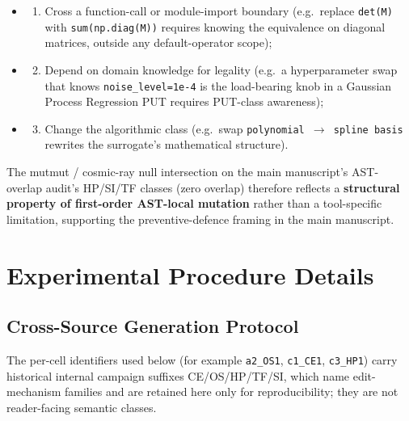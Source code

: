 \documentclass[manuscript,screen,review]{acmart}
\begin{document}
\begin{itemize}

\item
  \begin{enumerate}
  
  \item
    Cross a function-call or module-import boundary (e.g.~replace
    \texttt{det(M)} with \texttt{sum(np.diag(M))} requires knowing the
    equivalence on diagonal matrices, outside any default-operator
    scope);
  \end{enumerate}
\item
  \begin{enumerate}
  \setcounter{enumi}{1}
  
  \item
    Depend on domain knowledge for legality (e.g.~a hyperparameter swap
    that knows \texttt{noise\_level=1e-4} is the load-bearing knob in a
    Gaussian Process Regression PUT requires PUT-class awareness);
  \end{enumerate}
\item
  \begin{enumerate}
  \setcounter{enumi}{2}
  
  \item
    Change the algorithmic class (e.g.~swap
    \texttt{polynomial\ $\to$\ spline\ basis} rewrites the surrogate's
    mathematical structure).
  \end{enumerate}
\end{itemize}

The mutmut / cosmic-ray null intersection on the main manuscript's AST-overlap audit's HP/SI/TF classes
(zero overlap) therefore reflects a \textbf{structural property of
first-order AST-local mutation} rather than a tool-specific limitation,
supporting the preventive-defence framing in the main manuscript.


\section{Experimental Procedure Details}\label{c.-experimental-procedure-details}

\subsection{Cross-Source Generation Protocol}\label{c.1-cross-source-v4-protocol-full-specification}

The per-cell identifiers used below (for example \texttt{a2\_OS1},
\texttt{c1\_CE1}, \texttt{c3\_HP1}) carry historical internal campaign
suffixes CE/OS/HP/TF/SI, which name edit-mechanism families and are
retained here only for reproducibility; they are not reader-facing
semantic classes.
\end{document}
